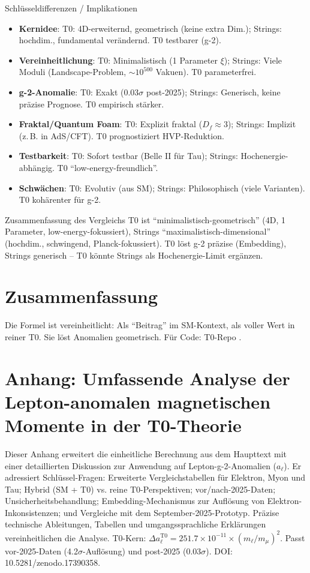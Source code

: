 \documentclass[12pt,a4paper]{article}
\begin{document}
	\begin{interpretation}{Schlüsseldifferenzen / Implikationen}
		\begin{itemize}
			\item \textbf{Kernidee}: T0: 4D-erweiternd, geometrisch (keine extra Dim.); Strings: hochdim., fundamental verändernd. T0 testbarer (g-2).
			\item \textbf{Vereinheitlichung}: T0: Minimalistisch (1 Parameter $\xi$); Strings: Viele Moduli (Landscape-Problem, $\sim 10^{500}$ Vakuen). T0 parameterfrei.
			\item \textbf{g-2-Anomalie}: T0: Exakt (0.03$\sigma$ post-2025); Strings: Generisch, keine präzise Prognose. T0 empirisch stärker.
			\item \textbf{Fraktal/Quantum Foam}: T0: Explizit fraktal ($D_f \approx 3$); Strings: Implizit (z.\,B. in AdS/CFT). T0 prognostiziert HVP-Reduktion.
			\item \textbf{Testbarkeit}: T0: Sofort testbar (Belle II für Tau); Strings: Hochenergie-abhängig. T0 ``low-energy-freundlich''.
			\item \textbf{Schwächen}: T0: Evolutiv (aus SM); Strings: Philosophisch (viele Varianten). T0 kohärenter für g-2.
		\end{itemize}
	\end{interpretation}
	
	\begin{result}{Zusammenfassung des Vergleichs}
		T0 ist ``minimalistisch-geometrisch'' (4D, 1 Parameter, low-energy-fokussiert), Strings ``maximalistisch-dimensional'' (hochdim., schwingend, Planck-fokussiert). T0 löst g-2 präzise (Embedding), Strings generisch -- T0 könnte Strings als Hochenergie-Limit ergänzen.
	\end{result}
	
	\section{Zusammenfassung}
	Die Formel ist vereinheitlicht: Als ``Beitrag'' im SM-Kontext, als voller Wert in reiner T0. Sie löst Anomalien geometrisch. Für Code: T0-Repo \cite{T0_Calc}.
	
	\appendix
	\section{Anhang: Umfassende Analyse der Lepton-anomalen magnetischen Momente in der T0-Theorie}
	
	Dieser Anhang erweitert die einheitliche Berechnung aus dem Haupttext mit einer detaillierten Diskussion zur Anwendung auf Lepton-g-2-Anomalien ($a_\ell$). Er adressiert Schlüssel-Fragen: Erweiterte Vergleichstabellen für Elektron, Myon und Tau; Hybrid (SM + T0) vs. reine T0-Perspektiven; vor/nach-2025-Daten; Unsicherheitsbehandlung; Embedding-Mechanismus zur Auflösung von Elektron-Inkonsistenzen; und Vergleiche mit dem September-2025-Prototyp. Präzise technische Ableitungen, Tabellen und umgangssprachliche Erklärungen vereinheitlichen die Analyse. T0-Kern: $\Delta a_\ell^\text{T0} = 251.7 \times 10^{-11} \times (m_\ell / m_\mu)^2$. Passt vor-2025-Daten (4.2$\sigma$-Auflösung) und post-2025 (0.03$\sigma$). DOI: 10.5281/zenodo.17390358.
	
\end{document}
